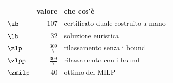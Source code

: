 \begin{center}\small
\begin{tabular}{lrl}
\toprule
 & valore & che cos'è \\
\midrule
$\ub$ & $107$ & certificato duale costruito a mano \\
$\lb$ & $32$ & soluzione euristica \\
$\zlp$ & $\frac{309}{7}$ & rilassamento senza i bound \\
$\zlpp$ & $\frac{309}{7}$ & rilassamento con i bound \\
$\zmilp$ & $40$ & ottimo del MILP \\
\bottomrule
\end{tabular}
\end{center}
